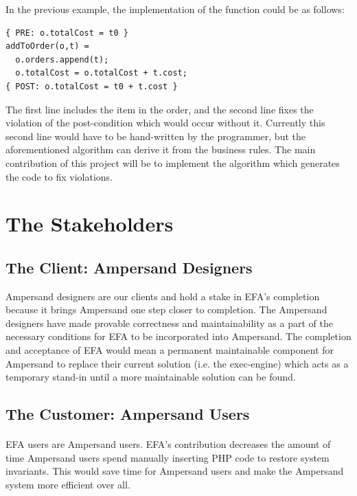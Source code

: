 \documentclass[12pt]{report}
\begin{document}
In the previous example, the implementation of the
function could be as follows: 

\begin{verbatim}
{ PRE: o.totalCost = t0 } 
addToOrder(o,t) = 
  o.orders.append(t);
  o.totalCost = o.totalCost + t.cost;
{ POST: o.totalCost = t0 + t.cost } 
\end{verbatim}

The first line includes the item in the order, and the second line fixes the
violation of the post-condition which would occur without it. Currently this
second line would have to be hand-written by the programmer, but the
aforementioned algorithm can derive it from the business rules. The main
contribution of this project will be to implement the algorithm which generates
the code to fix violations.


\section{The Stakeholders}\label{sec:Stakeholders}
\subsection{The Client: Ampersand Designers}\label{subsec:Ampersand}
Ampersand designers are our clients and hold a stake in EFA's completion 
because it brings Ampersand one step closer to completion. The Ampersand 
designers have made provable correctness and maintainability as a part of the 
necessary conditions for EFA to be incorporated into Ampersand. The completion 
and acceptance of EFA would mean a permanent maintainable component for 
Ampersand to replace their current solution (i.e. the exec-engine) which acts 
as a temporary stand-in until a more maintainable solution can be found.


\subsection{The Customer: Ampersand Users}\label{subsec:BusReq}
\paragraph{}
EFA users are Ampersand users. EFA's contribution decreases the amount of time 
Ampersand users spend manually inserting PHP code to restore system invariants. 
This would save time for Ampersand users and make the Ampersand system more 
efficient over all.
\end{document}
